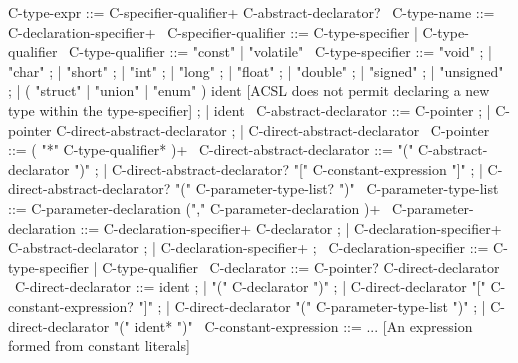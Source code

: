 \begin{syntax}
C-type-expr ::= C-specifier-qualifier+ C-abstract-declarator?
\
C-type-name ::= C-declaration-specifier+
\
C-specifier-qualifier ::= C-type-specifier | C-type-qualifier
\
C-type-qualifier ::= "const" | "volatile"
\
C-type-specifier ::= "void" ;
                   | "char" ;
                   | "short" ;
                   | "int" ;
                   | "long" ;
                   | "float" ;
                   | "double" ;
                   | "signed" ;
                   | "unsigned" ;
                   | ( "struct" | "union" | "enum" ) ident [ACSL does not permit declaring a new type within the type-specifier] ;
                   | ident
\
C-abstract-declarator ::= C-pointer ;
| C-pointer C-direct-abstract-declarator ;
| C-direct-abstract-declarator
\
C-pointer ::= ( "*" C-type-qualifier* )+
\
C-direct-abstract-declarator ::= "(" C-abstract-declarator ")" ; 
| C-direct-abstract-declarator? "[" C-constant-expression "]" ;
| C-direct-abstract-declarator? "(" C-parameter-type-list? ")"
\
C-parameter-type-list ::= C-parameter-declaration ("," C-parameter-declaration )+
\
C-parameter-declaration ::= C-declaration-specifier+ C-declarator ;
                          | C-declaration-specifier+ C-abstract-declarator ;
                          | C-declaration-specifier+ ;
\
C-declaration-specifier ::= C-type-specifier | C-type-qualifier
\
C-declarator ::= C-pointer? C-direct-declarator
\
C-direct-declarator ::= ident ;
                      | "(" C-declarator ")" ;
                      | C-direct-declarator "[" C-constant-expression? "]" ;
                      | C-direct-declarator "(" C-parameter-type-list ")" ;
                      | C-direct-declarator "(" ident* ")"
\
C-constant-expression ::=  ... [An expression formed from constant literals]
\end{syntax}
